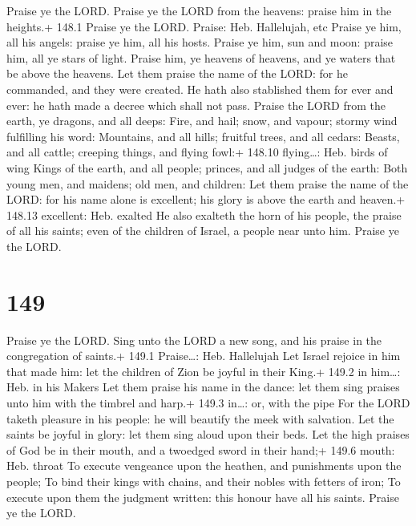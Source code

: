  Praise ye the LORD. Praise ye the LORD from the heavens:
praise him in the heights.+ 148.1 Praise ye the LORD. Praise: Heb.
Hallelujah, etc  Praise ye him, all his angels: praise ye
him, all his hosts.  Praise ye him, sun and moon: praise
him, all ye stars of light.  Praise him, ye heavens of
heavens, and ye waters that be above the heavens.  Let them
praise the name of the LORD: for he commanded, and they were created.
 He hath also stablished them for ever and ever: he hath
made a decree which shall not pass.  Praise the LORD from
the earth, ye dragons, and all deeps:  Fire, and hail; snow,
and vapour; stormy wind fulfilling his word:  Mountains, and
all hills; fruitful trees, and all cedars:  Beasts, and all
cattle; creeping things, and flying fowl:+ 148.10 flying\ldots: Heb.
birds of wing  Kings of the earth, and all people; princes,
and all judges of the earth:  Both young men, and maidens;
old men, and children:  Let them praise the name of the
LORD: for his name alone is excellent; his glory is above the earth and
heaven.+ 148.13 excellent: Heb. exalted  He also exalteth
the horn of his people, the praise of all his saints; even of the
children of Israel, a people near unto him. Praise ye the LORD.

\hypertarget{section-149}{%
\section{149}\label{section-149}}

 Praise ye the LORD. Sing unto the LORD a new song, and his
praise in the congregation of saints.+ 149.1 Praise\ldots: Heb.
Hallelujah  Let Israel rejoice in him that made him: let the
children of Zion be joyful in their King.+ 149.2 in him\ldots: Heb. in
his Makers  Let them praise his name in the dance: let them
sing praises unto him with the timbrel and harp.+ 149.3 in\ldots: or,
with the pipe  For the LORD taketh pleasure in his people:
he will beautify the meek with salvation.  Let the saints be
joyful in glory: let them sing aloud upon their beds.  Let
the high praises of God be in their mouth, and a twoedged sword in their
hand;+ 149.6 mouth: Heb. throat  To execute vengeance upon
the heathen, and punishments upon the people;  To bind their
kings with chains, and their nobles with fetters of iron; 
To execute upon them the judgment written: this honour have all his
saints. Praise ye the LORD.

